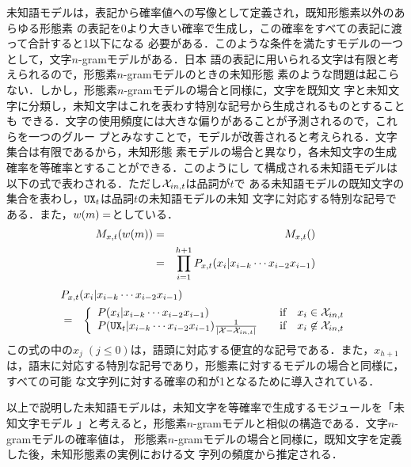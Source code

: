 未知語モデルは，表記から確率値への写像として定義され，既知形態素以外のあらゆる形態素
の表記を0より大きい確率で生成し，この確率をすべての表記に渡って合計すると1以下になる
必要がある．このような条件を満たすモデルの一つとして，文字$n$-gramモデルがある．日本
語の表記に用いられる文字は有限と考えられるので，形態素$n$-gramモデルのときの未知形態
素のような問題は起こらない．しかし，形態素$n$-gramモデルの場合と同様に，文字を既知文
字と未知文字に分類し，未知文字はこれを表わす特別な記号から生成されるものとすることも
できる．文字の使用頻度には大きな偏りがあることが予測されるので，これらを一つのグルー
プとみなすことで，モデルが改善されると考えられる．文字集合は有限であるから，未知形態
素モデルの場合と異なり，各未知文字の生成確率を等確率とすることができる．このようにし
て構成される未知語モデルは以下の式で表わされる．ただし${\cal X}_{in,t}$は品詞が$t$で
ある未知語モデルの既知文字の集合を表わし，${\tt UX}_{t}$は品詞$t$の未知語モデルの未知
文字に対応する特別な記号である．また，$w(m) = \Conc{x}{h}$としている．
\begin{eqnarray}
  \label{equation:ukwmodel0}
  M_{x,t}(w(m)) & = & M_{x,t}(\Conc{x}{h}) \\
  \label{equation:ukwmodel1}
                  & = & \prod_{i=1}^{h+1} P_{x,t}(x_{i}|x_{i-k} \cdots x_{i-2}x_{i-1})
\end{eqnarray}
\begin{eqnarray}
  \label{equation:ukwmodel2}
  \lefteqn{P_{x,t}(x_{i}|x_{i-k} \cdots x_{i-2}x_{i-1})} \nonumber \\
  & = & \left\{\begin{array}{lccl}
          P(x_{i}|x_{i-k} \cdots x_{i-2}x_{i-1})
            & & \mbox{if} & x_{i} \in {\cal X}_{in,t} \\
          P({\tt UX}_{t}|x_{i-k} \cdots x_{i-2}x_{i-1})\frac{1}{|{\cal X}-{\cal X}_{in,t}|}
            & & \mbox{if} & x_{i} \not \in {\cal X}_{in,t} \\
        \end{array}\right.
\end{eqnarray}
この式の中の$x_{j}\;(j \leq 0)$は，語頭に対応する便宜的な記号である．また，$x_{h+1}$
は，語末に対応する特別な記号であり，形態素に対するモデルの場合と同様に，すべての可能
な文字列に対する確率の和が1となるために導入されている．

以上で説明した未知語モデルは，未知文字を等確率で生成するモジュールを「未知文字モデル
」と考えると，形態素$n$-gramモデルと相似の構造である．文字$n$-gramモデルの確率値は，
形態素$n$-gramモデルの場合と同様に，既知文字を定義した後，未知形態素の実例における文
字列の頻度から推定される．


